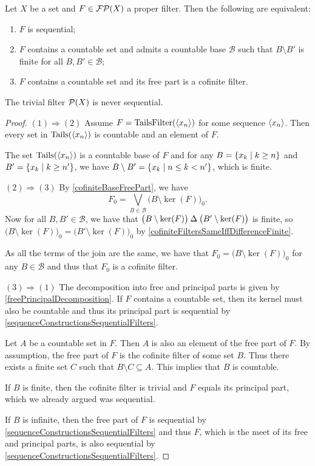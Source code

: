 \begin{proposition} \label{sequentialFilterCriteria}
Let $X$ be a set and $F\in\operatorname{\mathcal{FP}}(X)$ a proper filter.
Then the following are equivalent:
\begin{enumerate}
\item $F$ is sequential;
\item $F$ contains a countable set and admits a countable base $\mathcal{B}$ such that $B\setminus B'$ is finite for all $B,B'\in \mathcal{B}$;
\item $F$ contains a countable set and its free part is a cofinite filter.
\end{enumerate}
The trivial filter $\operatorname{\mathcal{P}}(X)$ is never sequential.
\end{proposition}
\begin{proof}
$\boxed{(1) \Rightarrow (2)}$ Assume $F = \operatorname{TailsFilter}(\left\langle x_n \right\rangle)$ for some sequence $\left\langle x_n \right\rangle$. Then every set in $\operatorname{Tails}(\left\langle x_n \right\rangle)$ is countable and an element of $F$.

The set $\operatorname{Tails}(\left\langle x_n \right\rangle)$ is a countable base of $F$ and for any $B = \setbuilder{x_k}{k\geq n}$ and $B' = \setbuilder{x_k}{k\geq n'}$, we have $B\setminus B' = \setbuilder{x_k}{n\leq k < n'}$, which is finite.

$\boxed{(2) \Rightarrow (3)}$ By \ref{cofiniteBaseFreePart}, we have
\[ F_0 = \bigvee_{B\in\mathcal{B}}\big(B\setminus \ker(F)\big)_0. \]
Now for all $B, B'\in \mathcal{B}$, we have that $\big(B\setminus \ker(F)\big)\mathbin{\Delta} \big(B'\setminus \ker(F)\big)$ is finite, so $\big(B\setminus \ker(F)\big)_0 = \big(B'\setminus \ker(F)\big)_0$ by \ref{cofiniteFiltersSameIffDifferenceFinite}.

As all the terms of the join are the same, we have that $F_0 = \big(B\setminus \ker(F)\big)_0$ for any $B\in\mathcal{B}$ and thus that $F_0$ is a cofinite filter.

$\boxed{(3) \Rightarrow (1)}$ The decomposition into free and principal parts is given by \ref{freePrincipalDecomposition}. If $F$ contains a countable set, then its kernel must also be countable and thus its principal part is sequential by \ref{sequenceConstructionsSequentialFilters}.

Let $A$ be a countable set in $F$. Then $A$ is also an element of the free part of $F$. By assumption, the free part of $F$ is the cofinite filter of some set $B$. Thus there exists a finite set $C$ such that $B\setminus C \subseteq A$. This implies that $B$ is countable.

If $B$ is finite, then the cofinite filter is trivial and $F$ equals its principal part, which we already argued was sequential.

If $B$ is infinite, then the free part of $F$ is sequential by \ref{sequenceConstructionsSequentialFilters} and thus $F$, which is the meet of its free and principal parts, is also sequential by \ref{sequenceConstructionsSequentialFilters}.
\end{proof}
